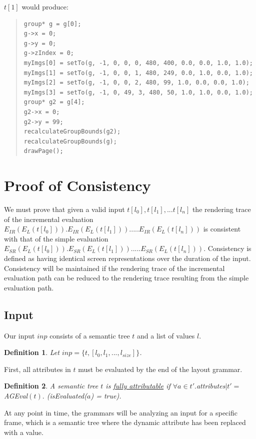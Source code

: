 \documentclass[11pt]{article}
\newtheorem{definition}{Definition}
\begin{document}
$t[1]$ would produce:

\begin{quote}
\begin{lstlisting}
group* g = g[0];
g->x = 0;
g->y = 0;
g->zIndex = 0;
myImgs[0] = setTo(g, -1, 0, 0, 0, 480, 400, 0.0, 0.0, 1.0, 1.0);
myImgs[1] = setTo(g, -1, 0, 0, 1, 480, 249, 0.0, 1.0, 0.0, 1.0);
myImgs[2] = setTo(g, -1, 0, 0, 2, 480, 99, 1.0, 0.0, 0.0, 1.0);
myImgs[3] = setTo(g, -1, 0, 49, 3, 480, 50, 1.0, 1.0, 0.0, 1.0);
group* g2 = g[4];
g2->x = 0;
g2->y = 99;
recalculateGroupBounds(g2);
recalculateGroupBounds(g);
drawPage();
\end{lstlisting}
\end{quote}

\section{Proof of Consistency}
We must prove that given a valid input $t[l_0], t[l_1], ... t[l_n]$ the rendering trace of the incremental evaluation\\$E_{IR}(E_L(t[l_0])).E_{IR}(E_L(t[l_1])). ... .E_{IR}(E_L(t[l_n]))$ is consistent with that of the simple evaluation\\ $E_{SR}(E_L(t[l_0])).E_{SR}(E_L(t[l_1])). ... .E_{SR}(E_L(t[l_n]))$. Consistency is defined as having identical screen representations over the duration of the input. Consistency will be maintained if the rendering trace of the incremental evaluation path can be reduced to the rendering trace resulting from the simple evaluation path.

\subsection{Input}

Our input $inp$ consists of a semantic tree $t$ and a list of values $l$.
\begin{definition}
Let $inp = \{t, [l_0, l_1, ..., l_{size}]\}$.
\end{definition} 

First, all attributes in $t$ must be evaluated by the end of the layout grammar.

\begin{definition}
A semantic tree $t$ is \underline {fully attributable} if $\forall a \in t'.$attributes$ | t'=$ AGEval$(t).$ (isEvaluated($a$) = true).
\end{definition}

At any point in time, the grammars will be analyzing an input for a specific frame, which is a semantic tree where the dynamic attribute has been replaced with a value.
\end{document}
